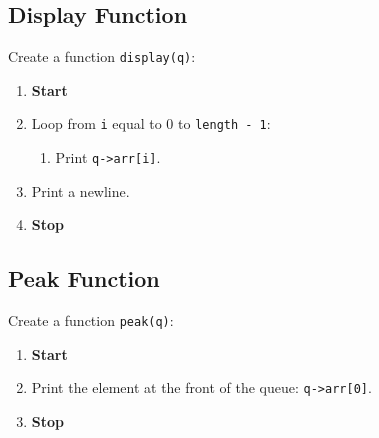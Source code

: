 {  \subsection{Display Function}
  Create a function \texttt{display(q)}:
  \begin{enumerate}[label=\arabic*:,left=0pt]
    \item \textbf{Start}
    \item Loop from \texttt{i} equal to 0 to \texttt{length - 1}:
          \begin{enumerate}[label=2.\arabic*:, start=1]
            \item Print \texttt{q->arr[i]}.
          \end{enumerate}
    \item Print a newline.
    \item \textbf{Stop}
  \end{enumerate}

  \subsection{ Peak Function }
  Create a function \texttt{peak(q)}:
  \begin{enumerate}[label=\arabic*:,left=0pt]
    \item \textbf{Start}
    \item Print the element at the front of the queue: \texttt{q->arr[0]}.
    \item \textbf{Stop}
  \end{enumerate}

}
